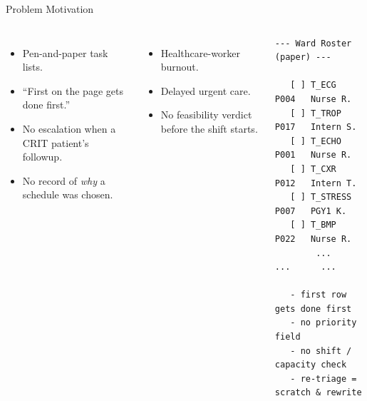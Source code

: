 \documentclass[aspectratio=169, 11pt]{beamer}
\begin{document}
\begin{frame}[fragile]{Problem Motivation}
  \begin{columns}[T,onlytextwidth]
      \begin{itemize}
        \item Pen-and-paper task lists.
        \item ``First on the page gets done first.''
        \item No escalation when a CRIT patient's followup.
        \item No record of \emph{why} a schedule was chosen.
      \end{itemize}
      \vspace{0.6em}
      \begin{itemize}
        \item Healthcare-worker burnout.
        \item Delayed urgent care.
        \item No feasibility verdict before the shift starts.
      \end{itemize}
      \begin{lstlisting}[language={},basicstyle=\ttfamily\scriptsize,
                         numbers=none,frame=single,
                         backgroundcolor=\color{boxbg},
                         framerule=0.4pt,breaklines=false,
                         rulecolor=\color{ruleblue}]
   --- Ward Roster (paper) ---

   [ ] T_ECG    P004   Nurse R.
   [ ] T_TROP   P017   Intern S.
   [ ] T_ECHO   P001   Nurse R.
   [ ] T_CXR    P012   Intern T.
   [ ] T_STRESS P007   PGY1 K.
   [ ] T_BMP    P022   Nurse R.
        ...     ...      ...

   - first row gets done first
   - no priority field
   - no shift / capacity check
   - re-triage = scratch & rewrite
      \end{lstlisting}
  \end{columns}
\end{frame}
\end{document}
